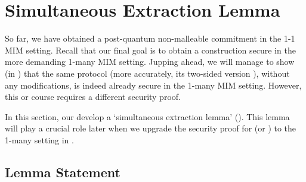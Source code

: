 
\newcommand{\projimp}{\mathsf{ProjImp}}
\newcommand{\API}{\mathsf{API}}
\newcommand{\shiftdis}[1]{\Delta_{\mathsf{Shift}}^{#1}}
\newcommand{\repair}{\mathsf{Repair}}
\newcommand{\repairA}{\mcal{A}\text{-}\mathsf{Repair}}

\section{Simultaneous Extraction Lemma}


So far, we have obtained a post-quantum non-malleable commitment in the 1-1 MIM setting. Recall that our final goal is to obtain a construction secure in the more demanding 1-many MIM setting. Jupping ahead, we will manage to show (in ) that the same protocol  (more accurately, its two-sided version ), without any modifications, is indeed already secure in the 1-many MIM setting. However, this or course requires a different security proof. 

In this section, our develop a `simultaneous extraction lemma' (). This lemma will play a crucial role later when we upgrade the security proof for  (or ) to the 1-many setting in .




\subsection{Lemma Statement}

